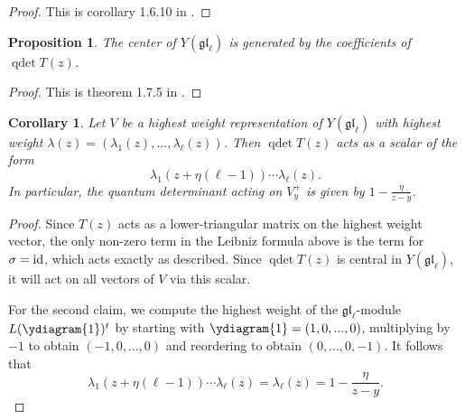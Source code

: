 \documentclass[11pt]{report}
\newtheorem{prop}[theorem]{Proposition}
\newtheorem{corollary}[theorem]{Corollary}
\theoremstyle{definition}
\theoremstyle{remark}
\theoremstyle{remark}
\newcommand{\id}{\textnormal{id}}
\begin{document}
\begin{proof}
This is corollary 1.6.10 in \cite{book:molev}.
\end{proof}

\begin{prop}
The center of $Y(\mathfrak{gl}_\ell)$ is generated by the coefficients of $\operatorname{qdet} T(z)$.
\end{prop}

\begin{proof}
This is theorem 1.7.5 in \cite{book:molev}.
\end{proof}

\begin{corollary}\label{corollary:quantumDetWeights}
Let $V$ be a highest weight representation of $Y(\mathfrak{gl}_\ell)$ with highest weight $\lambda(z) = (\lambda_1(z),...,\lambda_\ell(z))$. Then $\operatorname{qdet} T(z)$ acts as a scalar of the form
\begin{equation*}
\lambda_1(z+\eta(\ell-1)) \cdots \lambda_\ell(z).
\end{equation*}
In particular, the quantum determinant acting on $V_y^+$ is given by $1 - \frac{\eta}{z-y}$.
\end{corollary}

\begin{proof}
Since $T(z)$ acts as a lower-triangular matrix on the highest weight vector, the only non-zero term in the Leibniz formula above is the term for $\sigma = \id$, which acts exactly as described. Since $\operatorname{qdet} T(z)$ is central in $Y(\mathfrak{gl}_\ell)$, it will act on all vectors of $V$ via this scalar.

For the second claim, we compute the highest weight of the $\mathfrak{gl}_\ell$-module $L(\ydiagram{1})^t$ by starting with $\ydiagram{1} = (1,0,...,0)$, multiplying by $-1$ to obtain $(-1,0,...,0)$ and reordering to obtain $(0,...,0,-1)$. It follows that
\begin{equation*}
\lambda_1(z+\eta(\ell-1)) \cdots \lambda_\ell(z) = \lambda_\ell(z) = 1 - \frac{\eta}{z-y}.
\end{equation*}
\end{proof}
\end{document}
